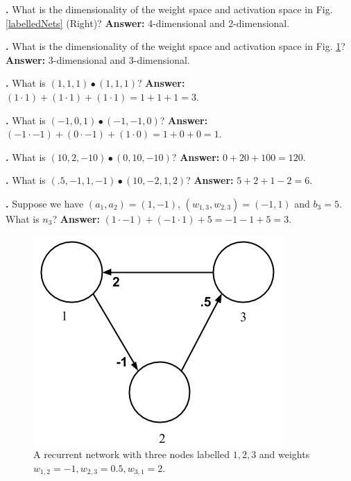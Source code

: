\noindent
{}
{\bf \theLinearAlgebraCounter.}  What is the dimensionality of the weight space and activation space in Fig. \ref{labelledNets} (Right)? 
{\bf Answer:} 4-dimensional and 2-dimensional.
\bigskip

\noindent
{}
{\bf \theLinearAlgebraCounter.}  What is the dimensionality of the weight space and activation space in Fig. \ref{sampleNetRecurrent}? 
{\bf Answer:} 3-dimensional and 3-dimensional.
\bigskip

\noindent
{}
{\bf \theLinearAlgebraCounter.}  What is $(1,1,1) \bullet  (1,1,1)$? 
{\bf Answer:}  $(1 \cdot 1) + (1 \cdot 1) + (1 \cdot 1) = 1 + 1 + 1 = 3$. 
\bigskip

\noindent
{}
{\bf \theLinearAlgebraCounter.}  What is $(-1,0,1) \bullet (-1,-1,0)$? 
{\bf Answer:} $(-1 \cdot -1) + (0 \cdot -1) + (1 \cdot 0) = 1 + 0 + 0 = 1$. 
\bigskip

\noindent
{}
{\bf \theLinearAlgebraCounter.}  What is $(10,2,-10) \bullet  (0,10,-10)$? 
{\bf Answer:}  $0 + 20 + 100 = 120$. 
\bigskip

\noindent
{}
{\bf \theLinearAlgebraCounter.}  What is $(.5,-1,1,-1) \bullet  (10,-2,1,2)$? 
{\bf Answer:}  $5 + 2 + 1 -2 = 6$. 
\bigskip

\noindent
{}
{\bf \theLinearAlgebraCounter.}  Suppose we have $(a_1,a_2) = (1,-1)$, $(w_{1,3}, w_{2,3})=(-1,1)$ and $b_3=5$. What is $n_3$? 
{\bf Answer:} $(1 \cdot -1) + (-1 \cdot 1) + 5 = -1 - 1 + 5 = 3$. 
\bigskip

\begin{figure}[h]
\centering
\includegraphics[scale=0.45]{./images/3NodeNet.png}
\caption[Jeff Yoshimi.]{A recurrent network with three nodes labelled $1,2,3$ and weights $w_{1,2} = -1, w_{2,3}=0.5, w_{3,1}=2$.}
\label{sampleNetRecurrent}
\end{figure}

